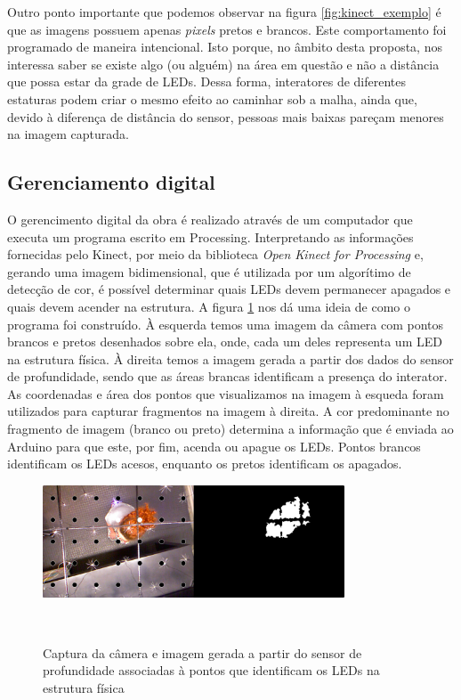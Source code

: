 Outro ponto importante que podemos observar na figura \ref{fig:kinect_exemplo} é que as imagens possuem apenas \textit{pixels} pretos e brancos. Este comportamento foi programado de maneira intencional. Isto porque, no âmbito desta proposta, nos interessa saber se existe algo (ou alguém) na área em questão e não a distância que possa estar da grade de LEDs. Dessa forma, interatores de diferentes estaturas podem criar o mesmo efeito ao caminhar sob a malha, ainda que, devido à diferença de distância do sensor, pessoas mais baixas pareçam menores na imagem capturada.


\subsection{Gerenciamento digital}

O gerencimento digital da obra é realizado através de um computador que executa um programa escrito em Processing. Interpretando as informações fornecidas pelo Kinect, por meio da biblioteca \textit{Open Kinect for Processing} e, gerando uma imagem bidimensional, que é utilizada por um algorítimo de detecção de cor, é possível determinar quais LEDs devem permanecer apagados e quais devem acender na estrutura. A figura \ref{fig:script} nos dá uma ideia de como o programa foi construído. À esquerda temos uma imagem da câmera com pontos brancos e pretos desenhados sobre ela, onde, cada um deles representa um LED na estrutura física. À direita temos a imagem gerada a partir dos dados do sensor de profundidade, sendo que as áreas brancas identificam a presença do interator. As coordenadas e área dos pontos que visualizamos na imagem à esqueda foram utilizados para capturar fragmentos na imagem à direita. A cor predominante no fragmento de imagem (branco ou preto) determina a informação que é enviada ao Arduino para que este, por fim, acenda ou apague os LEDs. Pontos brancos identificam os LEDs acesos, enquanto os pretos identificam os apagados.

\begin{figure}[H]
  \begin{center}
    \caption{Captura da câmera e imagem gerada a partir do sensor de profundidade associadas à pontos que identificam os LEDs na estrutura física}
    \vspace*{0,2cm}
    \includegraphics[width=0.8\textwidth]{./04-figuras/script}
    \label{fig:script}
  \end{center}
  \vspace*{-0,9cm}
  \\
\end{figure}


